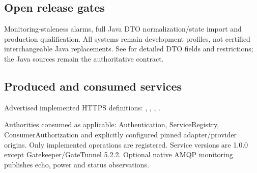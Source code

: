 \documentclass[a4paper]{arrowhead}
\begin{document}
\subsection{Open release gates}
Monitoring-staleness alarms, full Java DTO normalization/state import and production qualification. All systems remain development profiles, not certified interchangeable Java replacements. See  for detailed DTO fields and restrictions; the Java sources remain the authoritative contract.
\subsection{Produced and consumed services}
Advertised implemented HTTPS definitions: , \allowbreak {}, \allowbreak {}, \allowbreak {}.\par
Authorities consumed as applicable: Authentication, ServiceRegistry, ConsumerAuthorization and explicitly configured pinned adapter/provider origins. Only implemented operations are registered. Service versions are 1.0.0 except Gatekeeper/GateTunnel 5.2.2. Optional native AMQP monitoring publishes echo, power and status observations.
\end{document}
